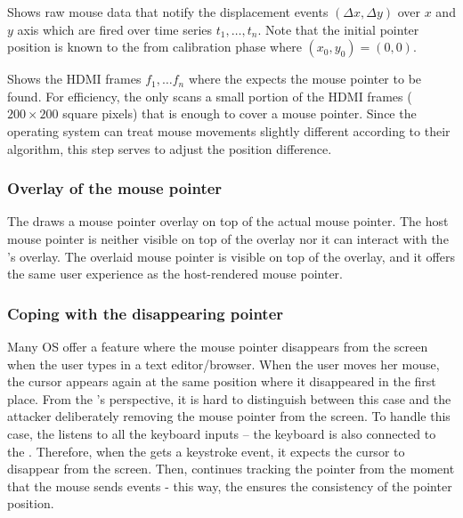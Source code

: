 \begin{mylist}
\item[]\one Shows raw mouse data that notify the displacement events $(\Delta x, \Delta y)$ over $x$ and $y$ axis which are fired over time series $t_1,\ldots, t_n$. Note that the initial pointer position is known to the \device from calibration phase where $(x_0, y_0) = (0, 0)$.  
\item[]\two Shows the HDMI frames $f_1,\ldots f_n$ where the \device expects the mouse pointer to be found. For efficiency, the \device only scans a small portion of the HDMI frames ($200 \times 200$ square pixels) that is enough to cover a mouse pointer. Since the operating system can treat mouse movements slightly different according to their algorithm, this step serves to adjust the position difference.
\end{mylist}


\subsubsection{\bfseries Overlay of the mouse pointer} The \device draws a mouse pointer overlay on top of the actual mouse pointer. The host mouse pointer is neither visible on top of the overlay nor it can interact with the \device's overlay. The overlaid mouse pointer is visible on top of the overlay, and it offers the same user experience as the host-rendered mouse pointer.


\subsubsection{\bfseries Coping with the disappearing pointer} Many OS offer a feature where the mouse pointer disappears from the screen when the user types in a text editor/browser. When the user moves her mouse, the cursor appears again at the same position where it disappeared in the first place. From the \device's perspective, it is hard to distinguish between this case and the attacker deliberately removing the mouse pointer from the screen. To handle this case, the \device listens to all the keyboard inputs -- the keyboard is also connected to the \device. Therefore, when the \device gets a keystroke event, it expects the cursor to disappear from the screen. Then, \device continues tracking the pointer from the moment that the mouse sends events  - this way, the \device ensures the consistency of the pointer position.  



